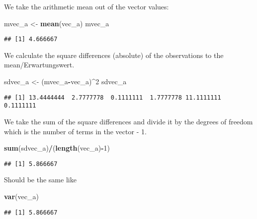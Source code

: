 \documentclass[]{article}
\newenvironment{Shaded}{\begin{snugshade}}{\end{snugshade}}
\newcommand{\KeywordTok}[1]{\textcolor[rgb]{0.13,0.29,0.53}{\textbf{#1}}}
\newcommand{\DecValTok}[1]{\textcolor[rgb]{0.00,0.00,0.81}{#1}}
\newcommand{\StringTok}[1]{\textcolor[rgb]{0.31,0.60,0.02}{#1}}
\newcommand{\OperatorTok}[1]{\textcolor[rgb]{0.81,0.36,0.00}{\textbf{#1}}}
\newcommand{\NormalTok}[1]{#1}
\begin{document}
We take the arithmetic mean out of the vector values:

\begin{Shaded}
\begin{Highlighting}[]
\NormalTok{mvec_a <-}\StringTok{ }\KeywordTok{mean}\NormalTok{(vec_a)}
\NormalTok{mvec_a}
\end{Highlighting}
\end{Shaded}

\begin{verbatim}
## [1] 4.666667
\end{verbatim}

We calculate the square differences (absolute) of the observations to
the mean/Erwartungswert.

\begin{Shaded}
\begin{Highlighting}[]
\NormalTok{sdvec_a <-}\StringTok{ }\NormalTok{(mvec_a}\OperatorTok{-}\NormalTok{vec_a)}\OperatorTok{^}\DecValTok{2}
\NormalTok{sdvec_a}
\end{Highlighting}
\end{Shaded}

\begin{verbatim}
## [1] 13.4444444  2.7777778  0.1111111  1.7777778 11.1111111  0.1111111
\end{verbatim}

We take the sum of the square differences and divide it by the degrees
of freedom which is the number of terms in the vector - 1.

\begin{Shaded}
\begin{Highlighting}[]
\KeywordTok{sum}\NormalTok{(sdvec_a)}\OperatorTok{/}\NormalTok{(}\KeywordTok{length}\NormalTok{(vec_a)}\OperatorTok{-}\DecValTok{1}\NormalTok{)}
\end{Highlighting}
\end{Shaded}

\begin{verbatim}
## [1] 5.866667
\end{verbatim}

Should be the same like

\begin{Shaded}
\begin{Highlighting}[]
\KeywordTok{var}\NormalTok{(vec_a)}
\end{Highlighting}
\end{Shaded}

\begin{verbatim}
## [1] 5.866667
\end{verbatim}
\end{document}

